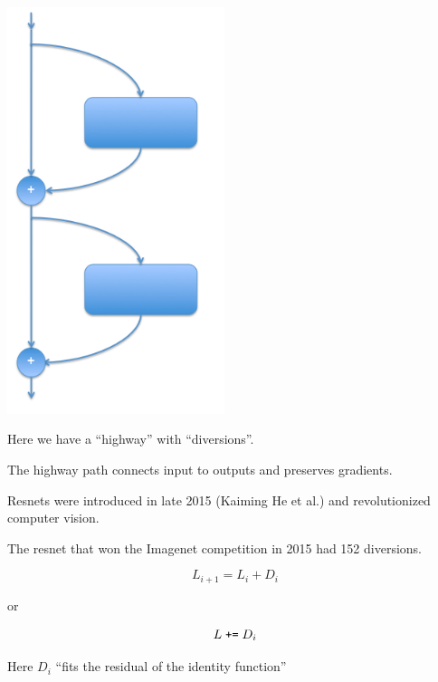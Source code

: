 {\vfill
\includegraphics[width= 2.5in]{../images/resnet}
\hfill \begin{minipage}[b]{4in}
  Here we have a ``highway'' with ``diversions''.

  \bigskip
  The highway path connects input to outputs and preserves gradients.

  \bigskip
  Resnets were introduced in late 2015 (Kaiming He et al.) and revolutionized computer vision.

  \bigskip
  The resnet that won the Imagenet competition in 2015 had 152 diversions.
\end{minipage}


$$L_{i+1} = L_i + D_i$$

\vfill
or

\vfill
$$L \;\mbox{\tt +=} \; D_i$$

\vfill
Here $D_i$ ``fits the residual of the identity function''


}
